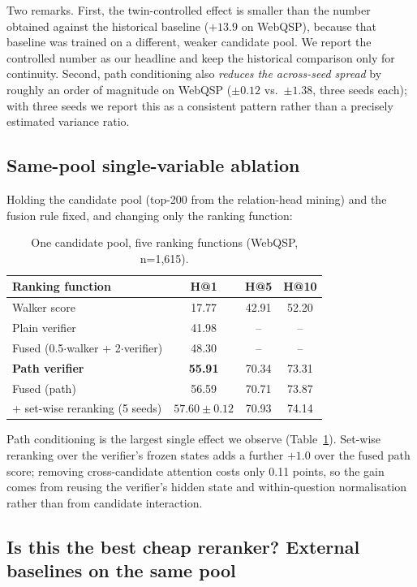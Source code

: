 \documentclass[sigconf,review]{acmart}
\begin{document}
Two remarks. First, the twin-controlled effect is smaller than the number obtained against the historical baseline ($+13.9$ on WebQSP), because that baseline was trained on a different, weaker candidate pool. We report the controlled number as our headline and keep the historical comparison only for continuity. Second, path conditioning also \emph{reduces the across-seed spread} by roughly an order of magnitude on WebQSP ($\pm0.12$ vs.\ $\pm1.38$, three seeds each); with three seeds we report this as a consistent pattern rather than a precisely estimated variance ratio.

\subsection{Same-pool single-variable ablation}
\label{sec:samepool}

Holding the candidate pool (top-200 from the relation-head mining) and the fusion rule fixed, and changing only the ranking function:

\begin{table}[t]
\centering\small
\caption{One candidate pool, five ranking functions (WebQSP, n=1,615).}
\label{tab:samepool}
\begin{tabular}{lccc}
\toprule
Ranking function & H@1 & H@5 & H@10 \\
\midrule
Walker score & 17.77 & 42.91 & 52.20 \\
Plain verifier & 41.98 & -- & -- \\
Fused (0.5$\cdot$walker + 2$\cdot$verifier) & 48.30 & -- & -- \\
\textbf{Path verifier} & \textbf{55.91} & 70.34 & 73.31 \\
Fused (path) & 56.59 & 70.71 & 73.87 \\
+ set-wise reranking (5 seeds) & $57.60\pm0.12$ & 70.93 & 74.14 \\
\bottomrule
\end{tabular}
\end{table}

Path conditioning is the largest single effect we observe (Table~\ref{tab:samepool}). Set-wise reranking over the verifier's frozen states adds a further $+1.0$ over the fused path score; removing cross-candidate attention costs only 0.11 points, so the gain comes from reusing the verifier's hidden state and within-question normalisation rather than from candidate interaction.

\subsection{Is this the best cheap reranker? External baselines on the same pool}
\label{sec:external}
\end{document}
